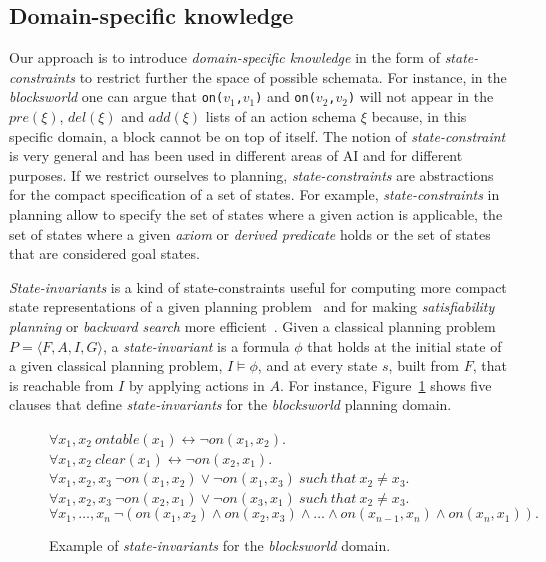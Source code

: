 \documentclass{article}
\newcommand{\tup}[1]{{\langle #1 \rangle}}
\begin{document}
\subsection{Domain-specific knowledge}
Our approach is to introduce {\em domain-specific knowledge} in the form of {\em state-constraints} to restrict further the space of possible schemata. For instance, in the {\em blocksworld} one can argue that {\small\tt on($v_1$,$v_1$)} and {\small\tt on($v_2$,$v_2$)} will not appear in the $pre(\xi)$, $del(\xi)$ and $add(\xi)$ lists of an action schema $\xi$ because, in this specific domain, a block cannot be on top of itself. The notion of {\em state-constraint} is very general and has been used in different areas of AI and for different purposes.  If we restrict ourselves to planning, {\em state-constraints} are abstractions for the compact specification of a set of states. For example, {\em state-constraints} in planning allow to specify the set of states where a given action is applicable, the set of states where a given {\em axiom} or {\em derived predicate} holds or the set of states that are considered goal states.

{\em State-invariants} is a kind of state-constraints useful for computing more compact state representations of a given planning problem~\cite{helmert2009concise} and for making {\em satisfiability planning} or {\em backward search} more efficient~\cite{rintanen2014madagascar,alcazar2015reminder}. Given a classical planning problem $P=\tup{F,A,I,G}$, a {\em state-invariant} is a formula $\phi$ that holds at the initial state of a given classical planning problem, $I\models \phi$, and at every state $s$, built from $F$, that is reachable from $I$ by applying actions in $A$. For instance, Figure~\ref{fig:strongest-invariant} shows five clauses that define {\em state-invariants} for the {\em blocksworld} planning domain. 

\begin{figure}[hbt!]
  \begin{footnotesize}
$\forall x_1,x_2\ ontable(x_1)\leftrightarrow\neg on(x_1,x_2)$.\\
$\forall x_1,x_2\ clear(x_1)\leftrightarrow\neg on(x_2,x_1)$.\\
$\forall x_1,x_2,x_3\ \neg on(x_1,x_2)\vee\neg on(x_1,x_3)\ such\ that\ x_2\neq x_3$.\\
$\forall x_1,x_2,x_3\ \neg on(x_2,x_1)\vee\neg on(x_3,x_1)\ such\ that\ x_2\neq x_3$.\\
$\forall x_1,\ldots,x_n\ \neg(on(x_1,x_2)\wedge on(x_2,x_3)\wedge\ldots\wedge on(x_{n-1},x_n)\wedge on(x_n,x_1)).$
\end{footnotesize}
 \caption{\small Example of {\em state-invariants} for the {\em blocksworld} domain.}
\label{fig:strongest-invariant}
\end{figure}
\end{document}
